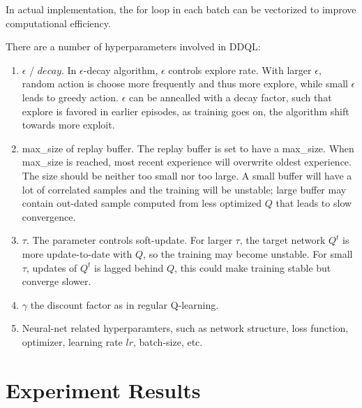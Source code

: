 \documentclass[conference]{IEEEtran}
\begin{document}
In actual implementation, the for loop in each batch can be vectorized to improve computational efficiency.

There are a number of hyperparameters involved in DDQL:
\begin{enumerate}
\item $\epsilon$ / $decay$. In $\epsilon$-decay algorithm, $\epsilon$ controls explore rate. With larger $\epsilon$, random action is choose more frequently and thus more explore, while small $\epsilon$ leads to greedy action. $\epsilon$ can be annealled with a decay factor, such that explore is favored in earlier episodes, as training goes on, the algorithm shift towards more exploit.
\item max\_size of replay buffer. The replay buffer is set to have a max\_size. When max\_size is reached, most recent experience will overwrite oldest experience. The size should be neither too small nor too large. A small buffer will have a lot of correlated samples and the training will be unstable; large buffer may contain out-dated sample computed from less optimized $Q$ that leads to slow convergence.
\item $\tau$. The parameter controls soft-update. For larger $\tau$, the target network $Q^t$ is more update-to-date with $Q$, so the training may become unstable. For small $\tau$, updates of $Q^t$ is lagged behind $Q$, this could make training stable but converge slower.
\item $\gamma$ the discount factor as in regular Q-learning.
\item Neural-net related hyperparamters, such as network structure, loss function, optimizer, learning rate $lr$, batch-size, etc.
\end{enumerate}
	
\section{Experiment  Results}
\end{document}
